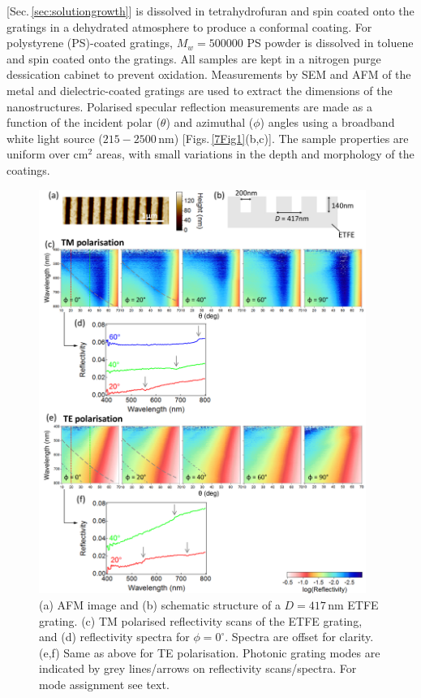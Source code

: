 [Sec.\,\ref{sec:solutiongrowth}] is dissolved in tetrahydrofuran and spin coated onto the gratings in a dehydrated atmosphere to produce a conformal coating. For polystyrene (PS)-coated gratings, $M_w=500000$ PS powder is dissolved in toluene and spin coated onto the gratings. All samples are kept in a nitrogen purge dessication cabinet to prevent oxidation. Measurements by SEM and AFM of the metal and dielectric-coated gratings are used to extract the dimensions of the nanostructures. Polarised specular reflection measurements are made as a function of the incident polar ($\theta$) and azimuthal ($\phi$) angles using a broadband white light source ($215-2500$\,nm) [Figs.\,\ref{7Fig1}(b,c)]. The sample properties are uniform over cm$^2$ areas, with small variations in the depth and morphology of the coatings.

\begin{figure}[h!] 
\centering    
\includegraphics[width=0.95\textwidth]{Fig2}
\caption[(a) AFM image and (b) schematic structure of a $D=417$\,nm ETFE grating. Reflectivity measurements of the ETFE grating in (c,d) TM and (e.f) TE polarisation.]{(a) AFM image and (b) schematic structure of a $D=417$\,nm ETFE grating. (c) TM polarised reflectivity scans of the ETFE grating, and (d) reflectivity spectra for $\phi=0^{\circ}$. Spectra are offset for clarity. (e,f) Same as above for TE polarisation. Photonic grating modes are indicated by grey lines/arrows on reflectivity scans/spectra. For mode assignment see text.}
\label{7Fig2}
\end{figure}

